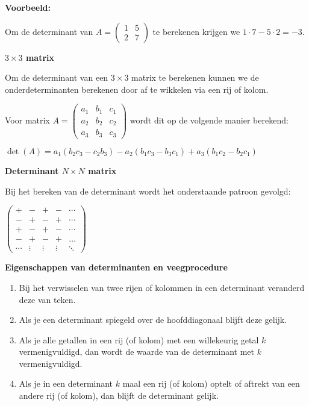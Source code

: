 \documentclass[11pt]{article}
\providecommand{\tightlist}{%
      \setlength{\itemsep}{0pt}\setlength{\parskip}{0pt}}
\begin{document}
\textbf{Voorbeeld:}

Om de determinant van \(A=\begin{pmatrix}1&5\\2&7\end{pmatrix}\) te
berekenen krijgen we \(1 \cdot 7 - 5 \cdot 2 = -3\).

\textbf{\(3 \times 3\) matrix}

Om de determinant van een \(3 \times 3\) matrix te berekenen kunnen we
de onderdeterminanten berekenen door af te wikkelen via een rij of
kolom.

Voor matrix
\(A = \begin{pmatrix}a_1&b_1&c_1\\a_2&b_2&c_2\\a_3&b_3&c_3 \end{pmatrix}\)
wordt dit op de volgende manier berekend:

\(\det(A) = a_1(b_2c_3-c_2b_3) - a_2(b_1c_3 - b_3c_1) + a_3(b_1c_2-b_2c_1)\)

\textbf{Determinant \(N\times N\) matrix}

Bij het bereken van de determinant wordt het onderstaande patroon
gevolgd:

\(\begin{pmatrix}+&-&+&-&\cdots\\-&+&-&+&\cdots\\+&-&+&-&\cdots\\-&+&-&+&\ldots\\\cdots& \vdots &\vdots&\vdots&\ddots\end{pmatrix}\)

\textbf{Eigenschappen van determinanten en veegprocedure}

\begin{enumerate}
\def\labelenumi{\arabic{enumi}.}
\tightlist
\item
  Bij het verwisselen van twee rijen of kolommen in een determinant
  veranderd deze van teken.
\item
  Als je een determinant spiegeld over de hoofddiagonaal blijft deze
  gelijk.
\item
  Als je alle getallen in een rij (of kolom) met een willekeurig getal
  \(k\) vermenigvuldigd, dan wordt de waarde van de determinant met
  \(k\) vermenigvuldigd.
\item
  Als je in een determinant \(k\) maal een rij (of kolom) optelt of
  aftrekt van een andere rij (of kolom), dan blijft de determinant
  gelijk.
\end{enumerate}
\end{document}
